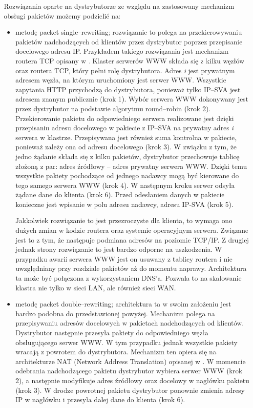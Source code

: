 \begin{itemize}
Rozwiązania oparte na dystrybutorze ze względu na zastosowany mechanizm obsługi pakietów możemy podzielić na:
\begin{itemize}
\item metodę packet single--rewriting; rozwiązanie to polega na przekierowywaniu pakietów nadchodzących od klientów przez 
dystrybutor poprzez przepisanie docelowego adresu IP. Przykładem takiego rozwiązania jest mechanizm routera TCP opisany 
w  \cite{gliwice11}. Klaster serwerów WWW składa się z kilku węzłów oraz routera TCP, który pełni rolę dystrybutora.
Adres \emph{i} jest prywatnym adresem węzła, na którym uruchomiony jest serwer WWW. Wszystkie zapytania HTTP przychodzą do 
dystrybutora, ponieważ tylko IP--SVA jest adresem znanym publicznie (krok 1). Wybór serwera WWW dokonywany jest przez 
dystrybutor na podstawie algorytmu round--robin (krok 2). Przekierowanie pakietu do odpowiedniego serwera realizowane jest
dzięki przepisaniu adresu docelowego w pakiecie z IP--SVA na prywatny adres \emph{i} serwera w klastrze. Przepisywana jest 
również suma kontrolna w pakiecie, ponieważ zależy ona od adresu docelowego (krok 3). W związku z tym, że jedno żądanie składa 
się z kilku pakietów, dystrybutor przechowuje tablicę złożoną z par: adres źródłowy -- adres prywatny serwera WWW. Dzięki temu 
wszystkie pakiety pochodzące od jednego nadawcy mogą być kierowane do tego samego serwera WWW (krok 4). W następnym kroku 
serwer odsyła żądane dane do klienta (krok 6). Przed odesłaniem danych w pakiecie konieczne jest wpisanie w polu adresu 
nadawcy, adresu IP-SVA (krok 5).

Jakkolwiek rozwiązanie to jest przezroczyste dla klienta, to wymaga ono dużych zmian w kodzie routera oraz systemie 
operacyjnym serwera. Związane jest to z tym, że następuje podmiana adresów na poziomie TCP/IP. Z drugiej jednak strony 
rozwiązanie to jest bardzo odporne na uszkodzenia. W przypadku awarii serwera WWW jest on usuwany z tablicy routera i nie 
uwzględniany przy rozdziale pakietów aż do momentu naprawy. Architektura ta może być połączona z wykorzystaniem DNS'a. Pozwala 
to na skalowanie klastra nie tylko w sieci LAN, ale również sieci WAN.
\item metodę packet double--rewriting; architektura ta w swoim założeniu jest bardzo podobna do przedstawionej powyżej. 
Mechanizm polega na przepisywaniu adresów docelowych w pakietach nadchodzących od klientów. Dystrybutor następnie przesyła 
pakiety do odpowiedniego węzła obsługującego serwer WWW. W tym przypadku jednak wszystkie pakiety wracają z powrotem do 
dystrybutora. Mechanizm ten opiera się na architekturze NAT (Network Address Translation) opisanej w  \cite{modele17}.
W momencie odebrania nadchodzącego pakietu dystrybutor wybiera serwer WWW (krok 2), a następnie modyfikuje adres źródłowy oraz 
docelowy w nagłówku pakietu (krok 3). W drodze powrotnej pakietu dystrybutor ponownie zmienia adresy IP w nagłówku i przesyła 
dalej dane do klienta (krok 6). 


\end{itemize}
\end{itemize}
